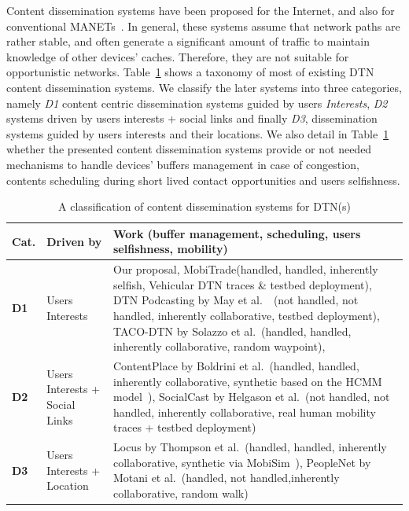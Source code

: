 Content dissemination systems have been proposed for the Internet, and also for conventional MANETs~\cite{BitHoc}. In general, these systems assume that network paths are rather stable, and often generate a significant amount of traffic to maintain knowledge of other devices' caches. Therefore, they are not suitable for opportunistic networks. Table~\ref{DisseminationSummary} shows a taxonomy of most of existing DTN content dissemination systems. We classify the later systems into three categories, namely  
\emph{D1} content centric dissemination systems guided by users \emph{Interests}, \emph{D2} systems driven by users interests + social links and finally
\emph{D3}, dissemination systems guided by users interests and their locations. We also detail in Table~\ref{DisseminationSummary} whether the presented content dissemination systems provide or not needed mechanisms to handle devices' buffers management in case of congestion, contents scheduling during short lived contact opportunities and users selfishness. 

\begin{table}[!h]
\renewcommand{\arraystretch}{1.1}
\caption{A classification of content dissemination systems for DTN(s)}
\centering
\footnotesize
\begin{tabular}{|p{1cm}|p{2cm}|p{9.5cm}|}
\hline
\bfseries Cat. &\bfseries Driven by&\bfseries Work (buffer management, scheduling, users selfishness, mobility)\\
\hline
\bfseries D1&Users Interests & Our proposal, MobiTrade(handled, handled, inherently selfish, Vehicular DTN traces \& testbed deployment), DTN Podcasting by May et al.~\cite{May07wirelessopportunistic}~\cite{Lenders:Podcast}(not handled, not handled, inherently collaborative, testbed deployment), TACO-DTN by Solazzo et al.~\cite{TACODTN}(handled, handled, inherently collaborative, random waypoint), \\
\hline
\bfseries D2&Users Interests + Social Links &ContentPlace by Boldrini et al.~\cite{Chiara:MSWIM08}(handled, handled, inherently collaborative, synthetic based on the HCMM model~\cite{HCMM}), SocialCast by Helgason et al.~\cite{SocialCast2, SocialCast}(not handled, not handled, inherently collaborative, real human mobility traces + testbed deployment)\\
\hline
\bfseries D3&Users Interests + Location & Locus by Thompson et al.~\cite{LOCUS}(handled, handled, inherently collaborative, synthetic via MobiSim~\cite{MobiSim}), PeopleNet by Motani et al.~\cite{Peoplenet}(handled, not handled,inherently collaborative, random walk)\\
\hline
\end{tabular}
\label{DisseminationSummary}
\end{table}

